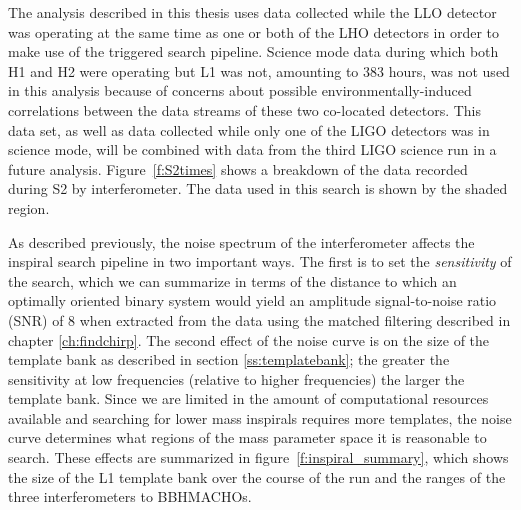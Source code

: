 The analysis described in this thesis uses data collected while the LLO
detector was operating at the same time as one or both of the LHO detectors in
order to make use of the triggered search pipeline.  Science mode data during
which both H1 and H2 were operating but L1 was not, amounting to 383 hours,
was not used in this analysis because of concerns about possible
environmentally-induced correlations between the data streams of these two
co-located detectors. This data set, as well as data collected while only one
of the LIGO detectors was in science mode, will be combined with data from the
third LIGO science run in a future analysis. Figure~\ref{f:S2times} shows a
breakdown of the data recorded during S2 by interferometer. The data used in
this search is shown by the shaded region.

As described previously, the noise spectrum of the interferometer affects the
inspiral search pipeline in two important ways. The first is to set the
\emph{sensitivity} of the search, which we can summarize  in terms of the
distance to which an optimally oriented binary system would yield an amplitude
signal-to-noise ratio (SNR) of 8 when extracted from the data using the
matched filtering described in chapter \ref{ch:findchirp}.  The second effect
of the noise curve is on the size of the template bank as described in section
\ref{ss:templatebank}; the greater the sensitivity at low frequencies
(relative to higher frequencies) the larger the template bank.  Since we are
limited in the amount of computational resources available and searching for
lower mass inspirals requires more templates, the noise curve determines what
regions of the mass parameter space it is reasonable to search. These effects
are summarized in figure~\ref{f:inspiral_summary}, which shows the size of the
L1 template bank over the course of the run and the ranges of the three
interferometers to BBHMACHOs.

